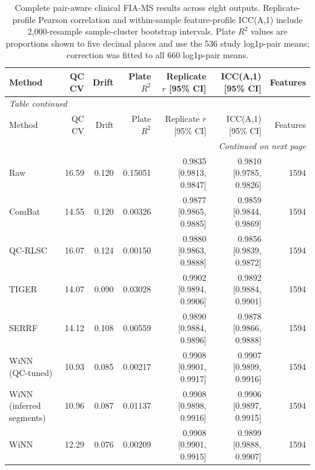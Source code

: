 \begin{landscape}
\scriptsize
\begin{longtable}{lrrrrrr}
\caption{Complete pair-aware clinical FIA-MS results across eight outputs. Replicate-profile Pearson correlation and within-sample feature-profile ICC(A,1) include 2,000-resample sample-cluster bootstrap intervals. Plate $R^2$ values are proportions shown to five decimal places and use the 536 study log1p-pair means; correction was fitted to all 660 log1p-pair means.}\label{tab:supp_clinical_all}\\
\toprule
Method & QC CV & Drift & Plate $R^2$ & Replicate $r$ [95\% CI] & ICC(A,1) [95\% CI] & Features \\
\midrule
\endfirsthead
\multicolumn{7}{l}{\textit{Table \thetable{} continued}}\\
\toprule
Method & QC CV & Drift & Plate $R^2$ & Replicate $r$ [95\% CI] & ICC(A,1) [95\% CI] & Features \\
\midrule
\endhead
\midrule
\multicolumn{7}{r}{\textit{Continued on next page}}\\
\endfoot
\bottomrule
\endlastfoot
Raw & 16.59 & 0.120 & 0.15051 & 0.9835 [0.9813, 0.9847] & 0.9810 [0.9785, 0.9826] & 1594 \\
ComBat & 14.55 & 0.120 & 0.00326 & 0.9877 [0.9865, 0.9885] & 0.9859 [0.9844, 0.9869] & 1594 \\
QC-RLSC & 16.07 & 0.124 & 0.00150 & 0.9880 [0.9863, 0.9888] & 0.9856 [0.9839, 0.9872] & 1594 \\
TIGER & 14.07 & 0.090 & 0.03028 & 0.9902 [0.9894, 0.9906] & 0.9892 [0.9884, 0.9901] & 1594 \\
SERRF & 14.12 & 0.108 & 0.00559 & 0.9890 [0.9884, 0.9896] & 0.9878 [0.9866, 0.9888] & 1594 \\
WiNN (QC-tuned) & 10.93 & 0.085 & 0.00217 & 0.9908 [0.9901, 0.9917] & 0.9907 [0.9899, 0.9916] & 1594 \\
WiNN (inferred segments) & 10.96 & 0.087 & 0.01137 & 0.9908 [0.9898, 0.9916] & 0.9906 [0.9897, 0.9915] & 1594 \\
WiNN & 12.29 & 0.076 & 0.00209 & 0.9908 [0.9901, 0.9915] & 0.9899 [0.9888, 0.9907] & 1594 \\
\end{longtable}
\end{landscape}

